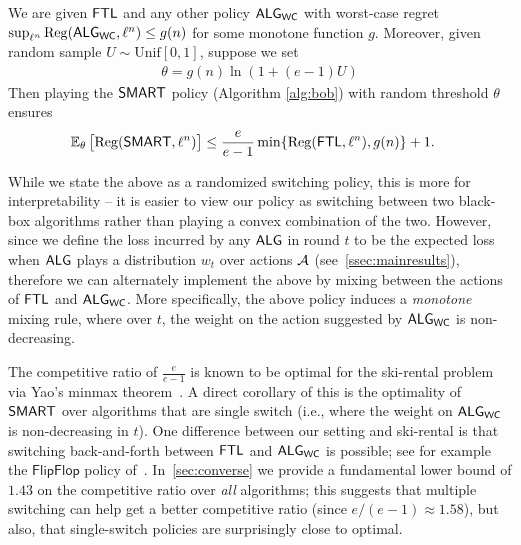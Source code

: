 \begin{theorem}  
\label{thm:SkiRentalRegret}
We are given $\mathsf{FTL}$ and any other policy $\mathsf{ALG}_{\mathsf{WC}}$ with worst-case regret $\sup_{\ell^n} \mathrm{Reg}(\mathsf{ALG}_{\mathsf{WC}}, \ell^n) \le g(n)$
for some monotone function $g$. 
Moreover, given random sample $U\sim\text{Unif}[0,1]$, suppose we set
      \begin{align*}
      \theta=g(n)\ln(1+(e-1)U)
      \end{align*}
      Then playing the $\mathsf{SMART}$ policy (Algorithm \ref{alg:bob}) with random threshold $\theta$ ensures 
    \begin{align*} 
        \operatorname{\mathbb{E}}_{\theta}&\left[\mathrm{Reg}(\mathsf{SMART}, \ell^n)\right]
        \le \frac{e}{e-1} \min\{\mathrm{Reg}(\mathsf{FTL},\ell^n),g(n)\} + 1.
    \end{align*}
\end{theorem}
While we state the above as a randomized switching policy, this is more for interpretability -- it is easier to view our policy as switching between two black-box algorithms rather than playing a convex combination of the two. However, since we define the loss incurred by any $\mathsf{ALG}$ in round $t$ to be the expected loss when $\mathsf{ALG}$ plays a distribution $w_t$ over actions $\mathcal{A}$ (see~\cref{ssec:mainresults}), therefore we can alternately implement the above by mixing between the actions of $\mathsf{FTL}$ and $\mathsf{ALG}_{\mathsf{WC}}$. More specifically, the above policy induces a \emph{monotone} mixing rule, where over $t$, the weight on the action suggested by $\mathsf{ALG}_{\mathsf{WC}}$ is non-decreasing.

\begin{remark} 
\label{rem:SkiRentalLB}
The competitive ratio of $\frac{e}{e-1}$ is known to be optimal for the ski-rental problem via Yao's minmax theorem~\citep{borodin2005online}. A direct corollary of this is the optimality of $\mathsf{SMART}$ over algorithms that are single switch (i.e., where the weight on $\mathsf{ALG}_{\mathsf{WC}}$ is non-decreasing in $t$). One difference between our setting and ski-rental is that switching back-and-forth between $\mathsf{FTL}$ and $\mathsf{ALG}_{\mathsf{WC}}$ is possible; see for example the $\mathsf{FlipFlop}$ policy of~\cite{de2014follow}. In~\cref{sec:converse} we provide a fundamental lower bound of $1.43$ on the competitive ratio over \emph{all} algorithms; this suggests that multiple switching can help get a better competitive ratio (since $e/(e-1)\approx 1.58$), but also, that single-switch policies are surprisingly close to optimal.
\end{remark}

